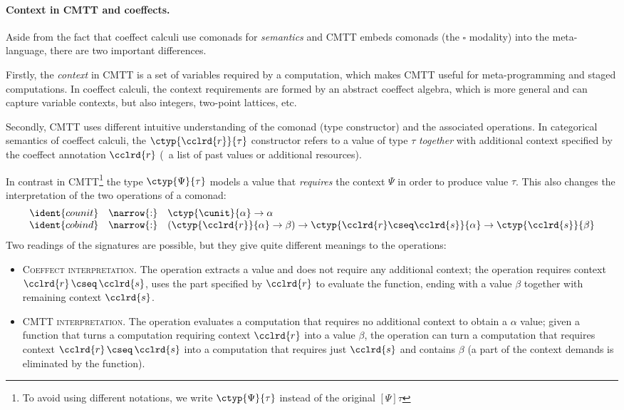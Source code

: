 \paragraph{Context in CMTT and coeffects.}
Aside from the fact that coeffect calculi use comonads for \emph{semantics} and CMTT embeds
comonads (the $\square$ modality) into the meta-language, there are two important differences.

Firstly, the \emph{context} in CMTT is a set of variables required by a computation, which
makes CMTT useful for meta-programming and staged computations. In coeffect calculi, the context
requirements are formed by an abstract coeffect algebra, which is more general and can capture
variable contexts, but also integers, two-point lattices, etc.

Secondly, CMTT uses different intuitive understanding of the comonad (type constructor) and
the associated operations. In categorical semantics of coeffect calculi, the $\ctyp{\cclrd{r}}{\tau}$
constructor refers to a value of type $\tau$ \emph{together} with additional context specified
by the coeffect annotation $\cclrd{r}$ (\eg~a list of past values or additional resources).

In contrast in CMTT\footnote{To avoid using different notations, we write $\ctyp{\Psi}{\tau}$ instead of the
original $[\Psi]{\tau}$} the type $\ctyp{\Psi}{\tau}$ models a value that \emph{requires} the
context $\Psi$ in order to produce value $\tau$. This also changes the interpretation of the
two operations of a comonad:
\begin{equation*}
\begin{array}{rcl}
 \ident{counit} &\narrow{:}& \ctyp{\cunit}{\alpha} \rightarrow \alpha\\
 \ident{cobind} &\narrow{:}& (\ctyp{\cclrd{r}}{\alpha} \rightarrow \beta) \rightarrow
    \ctyp{\cclrd{r}\cseq\cclrd{s}}{\alpha} \rightarrow \ctyp{\cclrd{s}}{\beta}
\end{array}
\end{equation*}
Two readings of the signatures are possible, but they give quite different meanings to the operations:

\begin{itemize}
\item \textsc{Coeffect interpretation.} The  operation extracts a value
  and does not require any additional context; the  operation requires
  context $\cclrd{r}\,\cseq\,\cclrd{s}$, uses the part specified by $\cclrd{r}$ to
  evaluate the function, ending with a value $\beta$ together with remaining context
  $\cclrd{s}$.
\item \textsc{CMTT interpretation.} The  operation evaluates a computation
  that requires no additional context to obtain a $\alpha$ value; given a function that
  turns a computation requiring context $\cclrd{r}$ into a value $\beta$, the 
  operation can turn a computation that requires context $\cclrd{r}\,\cseq\,\cclrd{s}$
  into a computation that requires just $\cclrd{s}$ and contains $\beta$ (a part of the
  context demands is eliminated by the function).
\end{itemize}

